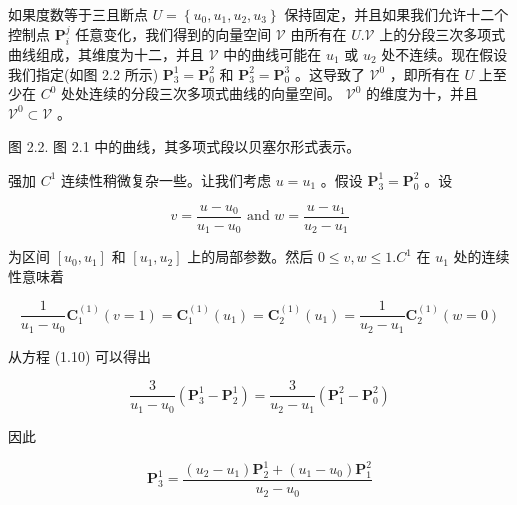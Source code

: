 \documentclass[../main.tex]{subfiles}
\begin{document}
如果度数等于三且断点 \(U = \left\{  {{u}_{0},{u}_{1},{u}_{2},{u}_{3}}\right\}\) 保持固定，并且如果我们允许十二个控制点 \({\mathbf{P}}_{i}^{j}\) 任意变化，我们得到的向量空间 \(\mathcal{V}\) 由所有在 \(U.\mathcal{V}\) 上的分段三次多项式曲线组成，其维度为十二，并且 \(\mathcal{V}\) 中的曲线可能在 \({u}_{1}\) 或 \({u}_{2}\) 处不连续。现在假设我们指定(如图 2.2 所示) \({\mathbf{P}}_{3}^{1} = {\mathbf{P}}_{0}^{2}\) 和 \({\mathbf{P}}_{3}^{2} = {\mathbf{P}}_{0}^{3}\) 。这导致了 \({\mathcal{V}}^{0}\) ，即所有在 \(U\) 上至少在 \({C}^{0}\) 处处连续的分段三次多项式曲线的向量空间。 \({\mathcal{V}}^{0}\) 的维度为十，并且 \({\mathcal{V}}^{0} \subset  \mathcal{V}\) 。



\begin{center}
\begin{minipage}{14cm}
\vspace*{.6\baselineskip}
\centering
{}
\par\smallskip
图 2.2. 图 2.1 中的曲线，其多项式段以贝塞尔形式表示。
\end{minipage}
\end{center}

强加 \({C}^{1}\) 连续性稍微复杂一些。让我们考虑 \(u = {u}_{1}\) 。假设 \({\mathbf{P}}_{3}^{1} = {\mathbf{P}}_{0}^{2}\) 。设

\[
v = \frac{u - {u}_{0}}{{u}_{1} - {u}_{0}}\text{ and }w = \frac{u - {u}_{1}}{{u}_{2} - {u}_{1}}
\]

为区间 \(\left\lbrack  {{u}_{0},{u}_{1}}\right\rbrack\) 和 \(\left\lbrack  {{u}_{1},{u}_{2}}\right\rbrack\) 上的局部参数。然后 \(0 \leq  v,w \leq  1.{C}^{1}\) 在 \({u}_{1}\) 处的连续性意味着

\[
\frac{1}{{u}_{1} - {u}_{0}}{\mathbf{C}}_{1}^{\left( 1\right) }\left( {v = 1}\right)  = {\mathbf{C}}_{1}^{\left( 1\right) }\left( {u}_{1}\right)  = {\mathbf{C}}_{2}^{\left( 1\right) }\left( {u}_{1}\right)  = \frac{1}{{u}_{2} - {u}_{1}}{\mathbf{C}}_{2}^{\left( 1\right) }\left( {w = 0}\right)
\]

从方程 (1.10) 可以得出

\[
\frac{3}{{u}_{1} - {u}_{0}}\left( {{\mathbf{P}}_{3}^{1} - {\mathbf{P}}_{2}^{1}}\right)  = \frac{3}{{u}_{2} - {u}_{1}}\left( {{\mathbf{P}}_{1}^{2} - {\mathbf{P}}_{0}^{2}}\right)
\]

因此

\[
{\mathbf{P}}_{3}^{1} = \frac{\left( {{u}_{2} - {u}_{1}}\right) {\mathbf{P}}_{2}^{1} + \left( {{u}_{1} - {u}_{0}}\right) {\mathbf{P}}_{1}^{2}}{{u}_{2} - {u}_{0}} \tag{2.1}
\]
\end{document}
